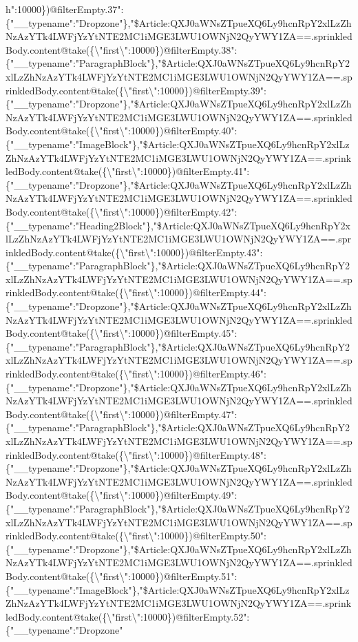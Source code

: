 h{}":10000\})@filterEmpty.37":\{"\_\_typename":"Dropzone"\},"\$Article:QXJ0aWNsZTpueXQ6Ly9hcnRpY2xlLzZhNzAzYTk4LWFjYzYtNTE2MC1iMGE3LWU1OWNjN2QyYWY1ZA==.sprinkledBody.content@take(\{\textbackslash{}"first\textbackslash{}":10000\})@filterEmpty.38":\{"\_\_typename":"ParagraphBlock"\},"\$Article:QXJ0aWNsZTpueXQ6Ly9hcnRpY2xlLzZhNzAzYTk4LWFjYzYtNTE2MC1iMGE3LWU1OWNjN2QyYWY1ZA==.sprinkledBody.content@take(\{\textbackslash{}"first\textbackslash{}":10000\})@filterEmpty.39":\{"\_\_typename":"Dropzone"\},"\$Article:QXJ0aWNsZTpueXQ6Ly9hcnRpY2xlLzZhNzAzYTk4LWFjYzYtNTE2MC1iMGE3LWU1OWNjN2QyYWY1ZA==.sprinkledBody.content@take(\{\textbackslash{}"first\textbackslash{}":10000\})@filterEmpty.40":\{"\_\_typename":"ImageBlock"\},"\$Article:QXJ0aWNsZTpueXQ6Ly9hcnRpY2xlLzZhNzAzYTk4LWFjYzYtNTE2MC1iMGE3LWU1OWNjN2QyYWY1ZA==.sprinkledBody.content@take(\{\textbackslash{}"first\textbackslash{}":10000\})@filterEmpty.41":\{"\_\_typename":"Dropzone"\},"\$Article:QXJ0aWNsZTpueXQ6Ly9hcnRpY2xlLzZhNzAzYTk4LWFjYzYtNTE2MC1iMGE3LWU1OWNjN2QyYWY1ZA==.sprinkledBody.content@take(\{\textbackslash{}"first\textbackslash{}":10000\})@filterEmpty.42":\{"\_\_typename":"Heading2Block"\},"\$Article:QXJ0aWNsZTpueXQ6Ly9hcnRpY2xlLzZhNzAzYTk4LWFjYzYtNTE2MC1iMGE3LWU1OWNjN2QyYWY1ZA==.sprinkledBody.content@take(\{\textbackslash{}"first\textbackslash{}":10000\})@filterEmpty.43":\{"\_\_typename":"ParagraphBlock"\},"\$Article:QXJ0aWNsZTpueXQ6Ly9hcnRpY2xlLzZhNzAzYTk4LWFjYzYtNTE2MC1iMGE3LWU1OWNjN2QyYWY1ZA==.sprinkledBody.content@take(\{\textbackslash{}"first\textbackslash{}":10000\})@filterEmpty.44":\{"\_\_typename":"Dropzone"\},"\$Article:QXJ0aWNsZTpueXQ6Ly9hcnRpY2xlLzZhNzAzYTk4LWFjYzYtNTE2MC1iMGE3LWU1OWNjN2QyYWY1ZA==.sprinkledBody.content@take(\{\textbackslash{}"first\textbackslash{}":10000\})@filterEmpty.45":\{"\_\_typename":"ParagraphBlock"\},"\$Article:QXJ0aWNsZTpueXQ6Ly9hcnRpY2xlLzZhNzAzYTk4LWFjYzYtNTE2MC1iMGE3LWU1OWNjN2QyYWY1ZA==.sprinkledBody.content@take(\{\textbackslash{}"first\textbackslash{}":10000\})@filterEmpty.46":\{"\_\_typename":"Dropzone"\},"\$Article:QXJ0aWNsZTpueXQ6Ly9hcnRpY2xlLzZhNzAzYTk4LWFjYzYtNTE2MC1iMGE3LWU1OWNjN2QyYWY1ZA==.sprinkledBody.content@take(\{\textbackslash{}"first\textbackslash{}":10000\})@filterEmpty.47":\{"\_\_typename":"ParagraphBlock"\},"\$Article:QXJ0aWNsZTpueXQ6Ly9hcnRpY2xlLzZhNzAzYTk4LWFjYzYtNTE2MC1iMGE3LWU1OWNjN2QyYWY1ZA==.sprinkledBody.content@take(\{\textbackslash{}"first\textbackslash{}":10000\})@filterEmpty.48":\{"\_\_typename":"Dropzone"\},"\$Article:QXJ0aWNsZTpueXQ6Ly9hcnRpY2xlLzZhNzAzYTk4LWFjYzYtNTE2MC1iMGE3LWU1OWNjN2QyYWY1ZA==.sprinkledBody.content@take(\{\textbackslash{}"first\textbackslash{}":10000\})@filterEmpty.49":\{"\_\_typename":"ParagraphBlock"\},"\$Article:QXJ0aWNsZTpueXQ6Ly9hcnRpY2xlLzZhNzAzYTk4LWFjYzYtNTE2MC1iMGE3LWU1OWNjN2QyYWY1ZA==.sprinkledBody.content@take(\{\textbackslash{}"first\textbackslash{}":10000\})@filterEmpty.50":\{"\_\_typename":"Dropzone"\},"\$Article:QXJ0aWNsZTpueXQ6Ly9hcnRpY2xlLzZhNzAzYTk4LWFjYzYtNTE2MC1iMGE3LWU1OWNjN2QyYWY1ZA==.sprinkledBody.content@take(\{\textbackslash{}"first\textbackslash{}":10000\})@filterEmpty.51":\{"\_\_typename":"ImageBlock"\},"\$Article:QXJ0aWNsZTpueXQ6Ly9hcnRpY2xlLzZhNzAzYTk4LWFjYzYtNTE2MC1iMGE3LWU1OWNjN2QyYWY1ZA==.sprinkledBody.content@take(\{\textbackslash{}"first\textbackslash{}":10000\})@filterEmpty.52":\{"\_\_typename":"Dropzone"